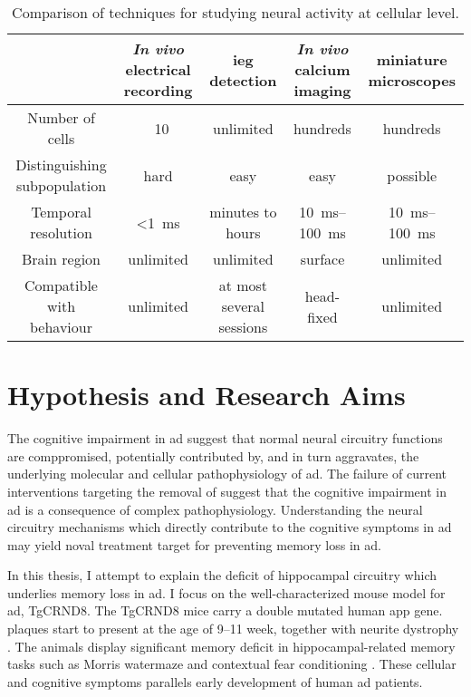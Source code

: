 \begin{table}
    \centering
    \begin{tabular}{| c | c | c | c | c |}
        \hline
        & \textit{In vivo} electrical recording & \Gls{ieg} detection & \textit{In vivo} calcium imaging & miniature microscopes \\ \hline
        Number of cells & ~10 & unlimited & hundreds & hundreds \\ \hline
        Distinguishing subpopulation & hard & easy & easy & possible \\ \hline
        Temporal resolution & <\SI{1}{\ms} & minutes to hours & \SIrange{10}{100}{\ms} & \SIrange{10}{100}{\ms} \\ \hline
        Brain region & unlimited & unlimited & surface & unlimited \\ \hline
        Compatible with behaviour & unlimited & at most several sessions & head-fixed & unlimited \\ \hline
    \end{tabular}
    \caption{Comparison of techniques for studying neural activity at cellular level. \label{tech-compare}} 
\end{table}

\section{Hypothesis and Research Aims}

The cognitive impairment in \gls{ad} suggest that normal neural circuitry functions are comppromised, potentially contributed by, and in turn aggravates, the underlying molecular and cellular pathophysiology of \gls{ad}. The failure of current interventions targeting the removal of \abeta{} suggest that the cognitive impairment in \gls{ad} is a consequence of complex pathophysiology. Understanding the neural circuitry mechanisms which directly contribute to the cognitive symptoms in \gls{ad} may yield noval treatment target for preventing memory loss in \gls{ad}. 

In this thesis, I attempt to explain the deficit of hippocampal circuitry which underlies memory loss in \gls{ad}. I focus on the well-characterized mouse model for \gls{ad}, TgCRND8. The TgCRND8 mice carry a double mutated human \gls{app} gene. \abeta{} plaques start to present at the age of 9--11 week, together with neurite dystrophy \citep{chishiti01}. The animals display significant memory deficit in hippocampal-related memory tasks such as Morris watermaze and contextual fear conditioning \citep{hyde05, yiu11}. These cellular and cognitive symptoms parallels early development of human \gls{ad} patients. 

